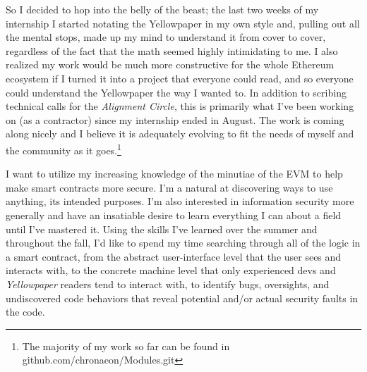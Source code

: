 \documentclass[11pt,a4paper,sans]{moderncv}
\begin{document}
So I decided to hop into the belly of the beast; the last two weeks of my internship I started notating the Yellowpaper in my own style and, pulling out all the mental stops, made up my mind to understand it from cover to cover, regardless of the fact that the math seemed highly intimidating to me. I also realized my work would be much more constructive for the whole Ethereum ecosystem if I turned it into a project that everyone could read, and so everyone could understand the Yellowpaper the way I wanted to. In addition to scribing technical calls for the \textit{Alignment Circle}, this is primarily what I've been working on (as a contractor) since my internship ended in August. The work is coming along nicely and I believe it is adequately evolving to fit the needs of myself and the community as it goes.\footnote{The majority of my work so far can be found in github.com/chronaeon/Modules.git} 

I want to utilize my increasing knowledge of the minutiae of the EVM to help make smart contracts more secure. I'm a natural at discovering ways to use anything, its intended purposes. I'm also interested in information security more generally and have an insatiable desire to learn everything I can about a field until I've  mastered it. Using the skills I've learned over the summer and throughout the fall, I'd like to spend my time searching through all of the logic in a smart contract, from the abstract user-interface level that the user sees and interacts with, to the concrete machine level that only experienced devs and \textit{Yellowpaper} readers tend to interact with, to identify bugs, oversights, and undiscovered code behaviors that reveal  potential and/or actual security faults in the code. 

\makeletterclosing
\end{document}
